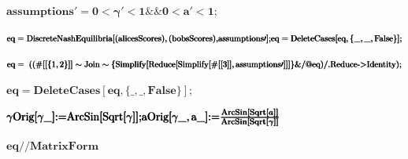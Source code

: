 \documentclass{article}
\begin{document}
\begin{doublespace}
\noindent\(\pmb{\text{assumptions$\prime $} = 0<\gamma \prime <1\&\&0<\text{a$\prime $}<1;}\)
\end{doublespace}

\begin{doublespace}
\noindent\(\pmb{\text{eq} = \text{DiscreteNashEquilibria}[(\text{alicesScores}),(\text{bobsScores}),}\\
\pmb{\text{assumptions$\prime $}];}\\
\pmb{\text{eq} = \text{DeleteCases}[\text{eq},\{\_,\_,\text{False}\}];}\)
\end{doublespace}

\begin{doublespace}
\noindent\(\pmb{\text{eq} = }\\
\pmb{((\#[[\{1,2\}]]\sim \text{Join}\sim }\\
\pmb{\{\text{Simplify}[\text{Reduce}[\text{Simplify}[\#[[3]],\text{assumptions$\prime $}]]]\}\&\text{/@}\text{eq})\text{/.}}\\
\pmb{\text{Reduce}\text{-$>$}\text{Identity});}\)
\end{doublespace}

\begin{doublespace}
\noindent\(\pmb{\text{eq} = \text{DeleteCases}[\text{eq},\{\_,\_,\text{False}\}];}\)
\end{doublespace}

\begin{doublespace}
\noindent\(\pmb{\text{$\gamma $Orig}[\gamma \_]\text{:=}\text{ArcSin}[\text{Sqrt}[\gamma ]];}\\
\pmb{\text{aOrig}[\gamma \_,\text{a$\_$}]\text{:=}\frac{\text{ArcSin}[\text{Sqrt}[a]]}{\text{ArcSin}[\text{Sqrt}[\gamma ]]}}\)
\end{doublespace}

\begin{doublespace}
\noindent\(\pmb{\text{eq}\text{//}\text{MatrixForm}}\)
\end{doublespace}
\end{document}
